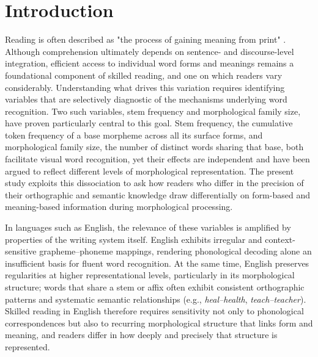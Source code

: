 \documentclass[utf8]{FrontiersinHarvard} %
\begin{document}
\section{Introduction}

Reading is often described as "the process of gaining meaning from print" \citep[][p.~34]{raynerHowPsychologicalScience2001}. Although comprehension ultimately depends on sentence- and discourse-level integration, efficient access to individual word forms and meanings remains a foundational component of skilled reading, and one on which readers vary considerably. Understanding what drives this variation requires identifying variables that are selectively diagnostic of the mechanisms underlying word recognition. Two such variables, stem frequency and morphological family size, have proven particularly central to this goal. Stem frequency, the cumulative token frequency of a base morpheme across all its surface forms, and morphological family size, the number of distinct words sharing that base, both facilitate visual word recognition, yet their effects are independent and have been argued to reflect different levels of morphological representation. The present study exploits this dissociation to ask how readers who differ in the precision of their orthographic and semantic knowledge draw differentially on form-based and meaning-based information during morphological processing.

In languages such as English, the relevance of these variables is amplified by properties of the writing system itself. English exhibits irregular and context-sensitive grapheme–phoneme mappings, rendering phonological decoding alone an insufficient basis for fluent word recognition. At the same time, English preserves regularities at higher representational levels, particularly in its morphological structure; words that share a stem or affix often exhibit consistent orthographic patterns and systematic semantic relationships (e.g., \textit{heal–health}, \textit{teach–teacher}). Skilled reading in English therefore requires sensitivity not only to phonological correspondences but also to recurring morphological structure that links form and meaning, and readers differ in how deeply and precisely that structure is represented.
\end{document}
